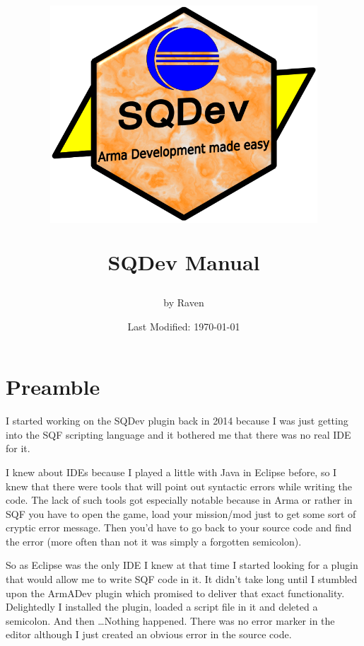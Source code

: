 \documentclass[twoside=false]{scrbook}
\newcommand{\SQDev}{SQDev\xspace}
\newcommand{\eclipse}{Eclipse\xspace}
\newcommand{\arma}{Arma\xspace}
\begin{document}
	
	\frontmatter
	
	
	\author{by Raven}
	\title{
		\begin{image}
			\includegraphics[width=10cm]{./../logo/SQDevLogo.png}
		\end{image}
		\vspace{1cm}
		\SQDev Manual
	}
	\date{Last Modified: \today}
	
	\maketitle
	
	\tableofcontents
	
	
	\chapter{Preamble}
	\label{ch:Preamble}
	I started working on the \SQDev plugin back in 2014 because I was just getting into the SQF scripting language and it bothered me that there was no real IDE for it.
	
	I knew about IDEs because I played a little with Java in \eclipse before, so I knew that there were tools that will point out syntactic errors while writing the code. The lack of such tools got especially notable because in \arma or rather in SQF you have to open the game, load your mission/mod just to get some sort of cryptic error message. Then you'd have to go back to your source code and find the error (more often than not it was simply a forgotten semicolon).
	
	So as \eclipse was the only IDE I knew at that time I started looking for a plugin that would allow me to write SQF code in it. It didn't take long until I stumbled upon the ArmADev plugin which promised to deliver that exact functionality. Delightedly I installed the plugin, loaded a script file in it and deleted a semicolon. And then \ldots Nothing happened. There was no error marker in the editor although I just created an obvious error in the source code.
	
\end{document}
